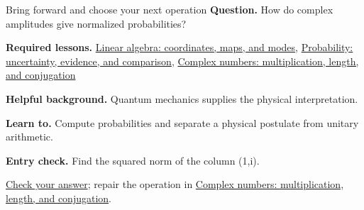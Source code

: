 \begin{learningcard}{Bring forward and choose your next operation}
\textsf{\textbf{Question.}} How do complex amplitudes give normalized probabilities?\par
\textbf{Required lessons.} \hyperref[learn:linear_algebra]{Linear algebra: coordinates, maps, and modes}, \hyperref[learn:probability]{Probability: uncertainty, evidence, and comparison}, \hyperref[learn:complex_numbers]{Complex numbers: multiplication, length, and conjugation}\par
\textbf{Helpful background.} Quantum mechanics supplies the physical interpretation.\par
\textbf{Learn to.} Compute probabilities and separate a physical postulate from unitary arithmetic.\par
\textbf{Entry check.} Find the squared norm of the column (1,i).\par
\hyperref[solution:entry:quantum]{Check your answer}; repair the operation in \hyperref[learn:complex_numbers]{Complex numbers: multiplication, length, and conjugation}.
\end{learningcard}
